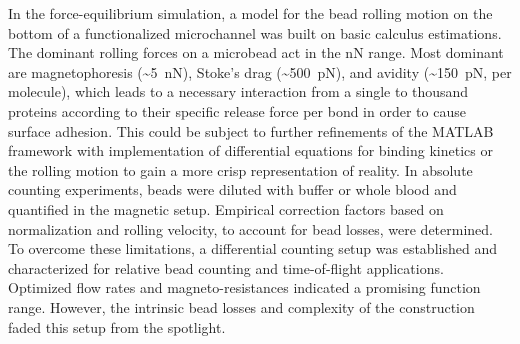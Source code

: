 In the force-equilibrium simulation, a model for the bead rolling motion on the bottom of a functionalized microchannel was built on basic calculus estimations. The dominant rolling forces on a microbead act in the \si{\nano\newton} range. Most dominant are magnetophoresis (\textasciitilde\SI{5}{\nano\newton}), Stoke's drag (\textasciitilde\SI{500}{\pico\newton}), and avidity (\textasciitilde\SI{150}{\pico\newton}, per molecule), which leads to a necessary interaction from a single to thousand proteins according to their specific release force per bond in order to cause surface adhesion. This could be subject to further refinements of the MATLAB framework with implementation of differential equations for binding kinetics \cite{lit:bio:BindingModeling} or the rolling motion to gain a more crisp representation of reality. 
\clearpage
In absolute counting experiments, beads were diluted with buffer or whole blood and quantified in the magnetic setup. Empirical correction factors based on normalization and rolling velocity, to account for bead losses, were determined. To overcome these limitations, a differential counting setup was established and characterized for relative bead counting and time-of-flight applications. Optimized flow rates and magneto-resistances indicated a promising function range. However, the intrinsic bead losses and complexity of the construction faded this setup from the spotlight.



